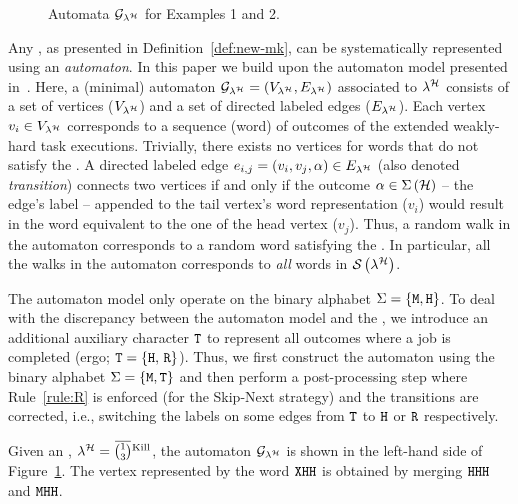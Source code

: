 \begin{figure}[t]
    \caption{Automata $\mathcal{G}_{\lambda^{\mathcal{H}}}$ for Examples 1 and 2.}
    \label{fig:min-graph}
\end{figure}
%
Any \ewhc{}, as presented in Definition~\ref{def:new-mk}, can be systematically represented using an \emph{automaton}.
In this paper we build upon the \tool{} automaton model presented in~{\cite{Vreman:2022}}.
Here, a (minimal) automaton $\mathcal{G}_{\lambda^{\mathcal{H}}} = \left(V_{\lambda^{\mathcal{H}}}, E_{\lambda^{\mathcal{H}}}\right)$ associated to $\lambda^{\mathcal{H}}$ consists of a set of vertices ($V_{\lambda^{\mathcal{H}}}$) and a set of directed labeled edges ($E_{\lambda^{\mathcal{H}}}$). 
Each vertex $v_i \in V_{\lambda^{\mathcal{H}}}$ corresponds to a sequence (word) of outcomes of the extended weakly-hard task executions. 
Trivially, there exists no vertices for words that do not satisfy the \ewhc{}.
A directed labeled edge $e_{i, j} = \left(v_i, v_j, \alpha \right) \in E_{\lambda^{\mathcal{H}}}$ (also denoted \emph{transition}) connects two vertices if and only if the outcome $\alpha \in \Sigma\left(\mathcal{H}\right)$ -- the edge's label -- appended to the tail vertex's word representation ($v_i$) would result in the word equivalent to the one of the head vertex ($v_j$).
Thus, a random walk in the automaton corresponds to a random word satisfying the \ewhc{}.
In particular, all the walks in the automaton corresponds to \emph{all} words in $\mathcal{S}_{}\left( \lambda^{\mathcal{H}} \right)$.

The \tool{} automaton model only operate on the binary alphabet $\Sigma = \left\{\texttt{M}, \texttt{H}\right\}$. 
To deal with the discrepancy between the \tool{} automaton model and the \ewhc{}, we introduce an additional auxiliary character $\texttt{T}$ to represent all outcomes where a job is completed (ergo; $\texttt{T} = \left\{ \texttt{H},\, \texttt{R} \right\}$).
Thus, we first construct the automaton using the binary alphabet $\Sigma = \{\texttt{M}, \texttt{T}\}$ and then perform a post-processing step where Rule~\ref{rule:R} is enforced (for the Skip-Next strategy) and the transitions are corrected, i.e., switching the labels on some edges from $\texttt{T}$ to $\texttt{H}$ or $\texttt{R}$ respectively. 

\begin{example}%
    \label{ex:auto-kill}%
    Given an \ewhc{}, $\lambda^{\strat} = \overbar{\binom{1}{3}}^{\text{Kill}}$, the automaton $\mathcal{G}_{\lambda^{\mathcal{H}}}$ is shown in the left-hand side of Figure~\ref{fig:min-graph}.
    The vertex represented by the word $\texttt{X}\texttt{H}\texttt{H}$ is obtained by merging $\texttt{H}\texttt{H}\texttt{H}$ and $\texttt{M}\texttt{H}\texttt{H}$.
\end{example}


